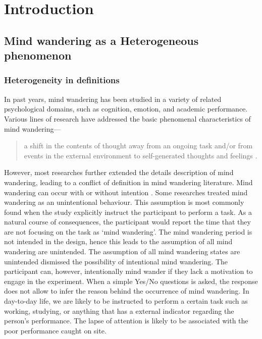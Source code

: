 \chapter{Introduction}
\label{ch:intro}

\newpage

\section{Mind wandering as a Heterogeneous phenomenon}

\subsection{Heterogeneity in definitions}
In past years, mind wandering has been studied in a variety of related psychological domains, such as cognition, emotion, and academic performance. Various lines of research have addressed the basic phenomenal characteristics of mind wandering---
\begin{quote}
    a shift in the contents of thought away from an ongoing task and/or from events in the external environment to self-generated thoughts and feelings \cite{SmallwoodSchooler2006,SmallwoodSchooler2015}.
\end{quote} 
However, most researches further extended the details description of mind wandering, leading to a conflict of definition in mind wandering literature. Mind wandering can occur with or without intention \cite{SeliTiCS2016}. Some researches treated mind wandering as an unintentional behaviour. This assumption is most commonly found when the study explicitly instruct the participant to perform a task. As a natural course of consequences, the participant would report the time that they are not focusing on the task as `mind wandering'. The mind wandering period is not intended in the design, hence this leads to the assumption of all mind wandering are unintended. The assumption of all mind wandering states are unintended dismissed the possibility of intentional mind wandering. The participant can, however, intentionally mind wander if they lack a motivation to engage in the experiment. When a simple Yes/No questions is asked, the response does not allow to infer the reason behind the occurrence of mind wandering. In day-to-day life, we are likely to be instructed to perform a certain task such as working, studying, or anything that has a external indicator regarding the person's performance. The lapse of attention is likely to be associated with the poor performance caught on site.  


